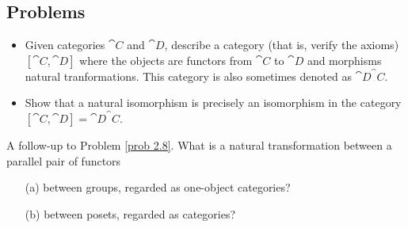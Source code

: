 \vspace*{0.2in}

\subsection{Problems}
\vspace{0.1in}

\begin{problem}\label{prob 3.1}\hfill
\begin{itemize}
\item Given categories $\cat{C}$ and $\cat{D}$, describe a category (that is, verify the axioms) $[\cat{C},\cat{D}]$ where the objects are functors from $\cat{C}$ to $\cat{D}$ and morphisms natural tranformations. This category is also sometimes denoted as $\cat{D}^\cat{C}$.
\item Show that a natural isomorphism is precisely an isomorphism in the category $[\cat{C},\cat{D}] = \cat{D}^\cat{C}$.
\end{itemize}
\end{problem}

\vspace{0.1in}

\begin{problem}\label{prob 3.1a}
A follow-up to Problem \ref{prob 2.8}. What is a natural transformation between a parallel pair of functors
\begin{itemize}
\item[(a)] between groups, regarded as one-object categories?
\item[(b)] between posets, regarded as categories?
\end{itemize}
\end{problem}

\vspace{0.1in}

